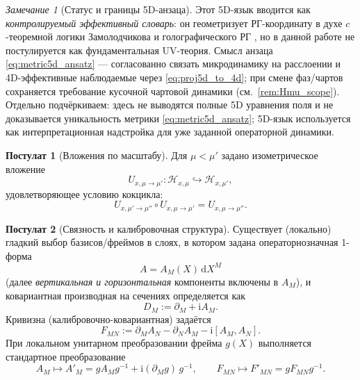 \documentclass[11pt,a4paper]{article}
\newcommand{\ii}{\mathrm{i}}
\newcommand{\dd}{\mathrm{d}}
\theoremstyle{definition}
\newtheorem{axiom}{Постулат}[section]
\theoremstyle{plain}
\theoremstyle{remark}
\newtheorem{remark}{Замечание}[section]
\begin{document}
\begin{remark}[Статус и границы 5D-анзаца]\label{rem:5dRG_status}
Этот 5D-язык вводится как \emph{контролируемый эффективный словарь}:
он геометризует РГ-координату в духе $c$-теоремной логики Замолодчикова
\cite{Zamolodchikov1986Irreversibility} и голографического РГ
\cite{deBoerVerlindeVerlinde2000HolographicRG},
но в данной работе не постулируется как фундаментальная UV-теория.
Смысл анзаца \eqref{eq:metric5d_ansatz} --- согласованно связать
микродинамику на расслоении и 4D-эффективные наблюдаемые через
\eqref{eq:proj5d_to_4d}; при смене фаз/чартов сохраняется требование кусочной
чартовой динамики (см.\ \cref{rem:Hmu_scope}).
Отдельно подчёркиваем: здесь не выводятся полные 5D уравнения поля и не доказывается
уникальность метрики \eqref{eq:metric5d_ansatz}; 5D-язык используется как
интерпретационная надстройка для уже заданной операторной динамики.
\end{remark}

\begin{axiom}[Вложения по масштабу]\label{ax:embeddings}
Для $\mu<\mu'$ задано изометрическое вложение
\begin{equation}\label{eq:embedding}
U_{x,\mu\to\mu'}:\mathcal H_{x,\mu}\hookrightarrow \mathcal H_{x,\mu'},
\end{equation}
удовлетворяющее условию кокцикла:
\begin{equation}\label{eq:cocycle}
U_{x,\mu'\to\mu''}\circ U_{x,\mu\to\mu'} = U_{x,\mu\to\mu''}.
\end{equation}
\end{axiom}

\begin{axiom}[Связность и калибровочная структура]\label{ax:connection}
Существует (локально) гладкий выбор базисов/фреймов в слоях, в котором задана операторнозначная 1-форма
\[
A = A_M(X)\,\dd X^M
\]
(далее \emph{вертикальная и горизонтальная} компоненты включены в $A_M$),
и ковариантная производная на сечениях определяется как
\begin{equation}\label{eq:covder}
D_M := \partial_M + \ii A_M.
\end{equation}
Кривизна (калибровочно-ковариантная) задаётся
\begin{equation}\label{eq:curvature}
F_{MN} := \partial_M A_N - \partial_N A_M - \ii[A_M,A_N].
\end{equation}
При локальном унитарном преобразовании фрейма $g(X)$ выполняется стандартное преобразование
\begin{equation}\label{eq:gaugetransf}
A_M \mapsto A'_M = gA_M g^{-1} + \ii(\partial_M g)\,g^{-1},
\qquad
F_{MN}\mapsto F'_{MN}=gF_{MN}g^{-1}.
\end{equation}
\end{axiom}
\end{document}

